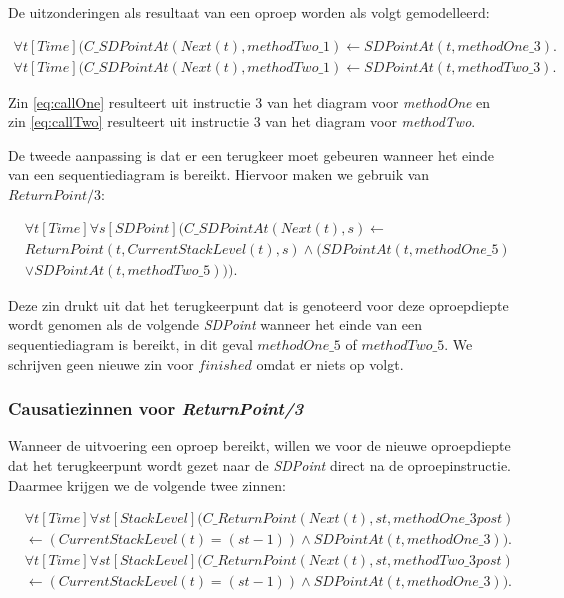 De uitzonderingen als resultaat van een oproep worden als volgt gemodelleerd:

\begin{align}
	 \forall{t}[Time](C\_SDPointAt(Next(t), methodTwo\_1) \leftarrow SDPointAt(t, methodOne\_3).\label{eq:callOne} \\
	 \forall{t}[Time](C\_SDPointAt(Next(t), methodTwo\_1) \leftarrow SDPointAt(t, methodTwo\_3).\label{eq:callTwo}
\end{align}

Zin \ref{eq:callOne} resulteert uit instructie 3 van het diagram voor \textit{methodOne} en zin \ref{eq:callTwo} resulteert uit instructie 3 van het diagram voor \textit{methodTwo}.

De tweede aanpassing is dat er een terugkeer moet gebeuren wanneer het einde van een sequentiediagram is bereikt. Hiervoor maken we gebruik van $ReturnPoint/3$:

\begin{align}
	&\nonumber \forall{t}[Time]\forall{s}[SDPoint](C\_SDPointAt(Next(t), s) \leftarrow \\ \nonumber &ReturnPoint(t, CurrentStackLevel(t), s) \land (SDPointAt(t, methodOne\_5) \\ &\lor SDPointAt(t, methodTwo\_5))).\label{eq:sd-return}
\end{align}

Deze zin drukt uit dat het terugkeerpunt dat is genoteerd voor deze oproepdiepte wordt genomen als de volgende \textit{SDPoint} wanneer het einde van een sequentiediagram is bereikt, in dit geval $methodOne\_5$ of $methodTwo\_5$. We schrijven geen nieuwe zin voor $finished$ omdat er niets op volgt.

\subsubsection{Causatiezinnen voor \textit{ReturnPoint/3}}
Wanneer de uitvoering een oproep bereikt, willen we voor de nieuwe oproepdiepte dat het terugkeerpunt wordt gezet naar de \textit{SDPoint} direct na de oproepinstructie. Daarmee krijgen we de volgende twee zinnen:

\begin{align}
	\nonumber &\forall{t}[Time]\forall{st}[StackLevel](C\_ReturnPoint(Next(t), st, methodOne\_3post) \\ &\leftarrow (CurrentStackLevel(t) = (st-1)) \land SDPointAt(t, methodOne\_3)). \\
	\nonumber &\forall{t}[Time]\forall{st}[StackLevel](C\_ReturnPoint(Next(t), st, methodTwo\_3post) \\ &\leftarrow (CurrentStackLevel(t) = (st-1)) \land SDPointAt(t, methodOne\_3)).
\end{align}

